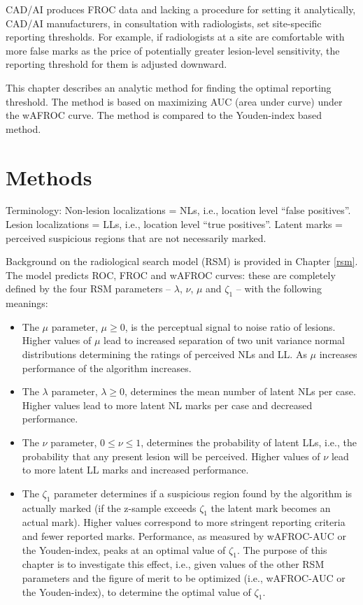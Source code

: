 \documentclass[
]{book}
\begin{document}
CAD/AI produces FROC data and lacking a procedure for setting it analytically, CAD/AI manufacturers, in consultation with radiologists, set site-specific reporting thresholds. For example, if radiologists at a site are comfortable with more false marks as the price of potentially greater lesion-level sensitivity, the reporting threshold for them is adjusted downward.

This chapter describes an analytic method for finding the optimal reporting threshold. The method is based on maximizing AUC (area under curve) under the wAFROC curve. The method is compared to the Youden-index based method.

\hypertarget{optim-op-point-methods}{%
\section{Methods}\label{optim-op-point-methods}}

Terminology:
Non-lesion localizations = NLs, i.e., location level ``false positives''.
Lesion localizations = LLs, i.e., location level ``true positives''.
Latent marks = perceived suspicious regions that are not necessarily marked.

Background on the radiological search model (RSM) is provided in Chapter \ref{rsm}. The model predicts ROC, FROC and wAFROC curves: these are completely defined by the four RSM parameters -- \(\lambda\), \(\nu\), \(\mu\) and \(\zeta_1\) -- with the following meanings:

\begin{itemize}
\item
  The \(\mu\) parameter, \(\mu \ge 0\), is the perceptual signal to noise ratio of lesions. Higher values of \(\mu\) lead to increased separation of two unit variance normal distributions determining the ratings of perceived NLs and LL. As \(\mu\) increases performance of the algorithm increases.
\item
  The \(\lambda\) parameter, \(\lambda \ge 0\), determines the mean number of latent NLs per case. Higher values lead to more latent NL marks per case and decreased performance.
\item
  The \(\nu\) parameter, \(0 \le \nu \le 1\), determines the probability of latent LLs, i.e., the probability that any present lesion will be perceived. Higher values of \(\nu\) lead to more latent LL marks and increased performance.
\item
  The \(\zeta_1\) parameter determines if a suspicious region found by the algorithm is actually marked (if the z-sample exceeds \(\zeta_1\) the latent mark becomes an actual mark). Higher values correspond to more stringent reporting criteria and fewer reported marks. Performance, as measured by wAFROC-AUC or the Youden-index, peaks at an optimal value of \(\zeta_1\). The purpose of this chapter is to investigate this effect, i.e., given values of the other RSM parameters and the figure of merit to be optimized (i.e., wAFROC-AUC or the Youden-index), to determine the optimal value of \(\zeta_1\).
\end{itemize}
\end{document}
